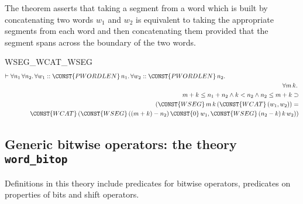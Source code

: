 The theorem  asserts that taking a segment from a
word which is built by concatenating two words $w_1$ and $w_2$ is
equivalent to taking the appropriate segments from each word and then
concatenating them provided that the segment spans across the boundary
of the two words.
\begin{holthm}{WSEG_WCAT_WSEG}
\begin{eqnarray*}
\lefteqn{\THM \FORALL n_{1}\,\FORALL n_{2}\DOT
        \FORALL w_1 :: \CONST{PWORDLEN} \,n_{1}\DOT
        \FORALL w_2 :: \CONST{PWORDLEN} \,n_{2}\DOT} \\
 & & {} \FORALL m \,k\DOT \\
 & & \quad m + k \LEE  n_{1} + n_{2} \AND k \LES  n_{2} \AND
                                  n_{2} \LEE  m + k \IMP \\
 & & \qquad (\CONST{WSEG} \,m \,k \,(\CONST{WCAT} \,(w_{1}, w_{2})) = \\
 & & \qquad \quad \CONST{WCAT} \,
        (\CONST{WSEG} \,((m + k) - n_{2}) \,\CONST{0} \,w_{1},
         \CONST{WSEG} \,(n_{2} - k) \,k \,w_{2}))
\end{eqnarray*}
\end{holthm}

\subsection{Generic bitwise operators: the theory {\tt word\_bitop}}

Definitions in this theory include predicates for bitwise operators,
predicates on properties of bits and shift operators.

